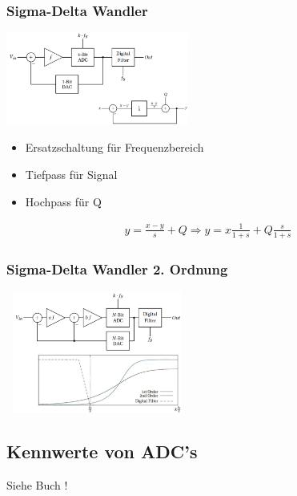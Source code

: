 \begin{multicols}{2}
	
\subsubsection{Sigma-Delta Wandler }
	\includegraphics[width=6cm, valign=t]{pictures/deltaSigma1}
	\begin{itemize}
	      \item Ersatzschaltung für Frequenzbereich
	      \item Tiefpass für Signal
	      \item Hochpass für Q
	\end{itemize}
	\begin{align*}
	  y=\frac{x-y}{s}+Q\Rightarrow y=x\frac{1}{1+s}+Q\frac{s}{1+s}
	\end{align*}


\subsubsection{Sigma-Delta Wandler 2. Ordnung }
\includegraphics[width=6cm, height =4cm]{pictures/deltaSigma2}


\subsection{Kennwerte von ADC's}
Siehe Buch !

\end{multicols}
